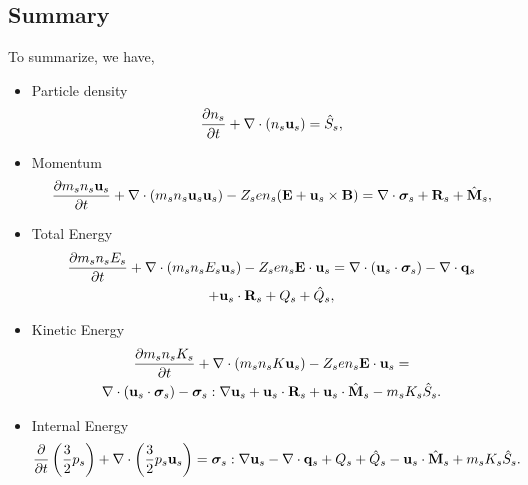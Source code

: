 \documentclass[a4paper,11pt]{report}
\begin{document}
\subsection{Summary}
To summarize, we have,
\begin{itemize}
    \item Particle density
\begin{equation}
\label{eq:cons_mass}
    \frac{\partial n_s}{\partial t} + \nabla \cdot \left ( n_s \mathbf{u}_s \right ) = \hat{S}_s,
\end{equation}

    \item Momentum
\begin{equation}
\label{eq:cons_mom}
    \frac{\partial m_s n_s \mathbf{u}_s}{\partial t} + \nabla \cdot \left ( m_s n_s \mathbf{u}_s \mathbf{u}_s \right) - Z_s e n_s ( \mathbf{E} + \mathbf{u}_s \times \mathbf{B} ) = \nabla \cdot \bm \sigma_s + \mathbf{R}_s + \hat{\mathbf{M}}_s,
\end{equation}

    \item Total Energy
\begin{multline}
\label{eq:cons_te}
\frac{\partial m_s n_s E_s}{\partial t} + \nabla \cdot (m_s n_s E_s \mathbf{u}_s ) - Z_s e n_s \mathbf{E} \cdot \mathbf{u}_s = \nabla \cdot ( \mathbf{u}_s \cdot \bm \sigma_s ) - \nabla \cdot \mathbf{q}_s \\
+ \mathbf{u}_s \cdot \mathbf{R}_s + Q_{s} + \hat{Q}_s, 
\end{multline}
    
    \item Kinetic Energy
\begin{multline}
\label{eq:cons_ke}
\frac{\partial m_s n_s K_s}{\partial t} + \nabla \cdot ( m_s n_s K \mathbf{u}_s ) - Z_s e n_s \mathbf{E} \cdot \mathbf{u}_s =\\
\nabla \cdot (\mathbf{u}_s \cdot \bm \sigma_s ) - \bm \sigma_s : \nabla \mathbf{u}_s + \mathbf{u}_s \cdot \mathbf{R}_s + \mathbf{u}_s \cdot \hat{\mathbf{M}}_s - m_s K_s \hat{S}_s .
\end{multline}    
    
    \item Internal Energy
\begin{equation}
\label{eq:cons_ie}
    \frac{\partial}{\partial t} \left ( \frac{3}{2} p_s \right ) + \nabla \cdot \left ( \frac{3}{2} p_s \mathbf{u}_s \right ) = \bm \sigma_s : \nabla \mathbf{u}_s - \nabla \cdot \mathbf{q}_s + Q_{s} + \hat{Q}_s - \mathbf{u}_s \cdot \hat{\mathbf{M}}_s + m_s K_s \hat{S}_s .  
\end{equation}

\end{itemize}
\end{document}
